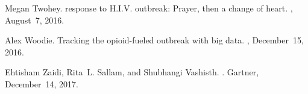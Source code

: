 \documentclass[11pt]{article}
\begin{document}
\begin{small}
\begin{thebibliography}{10}
Megan Twohey.
 response to {H.I.V}. outbreak: Prayer, then a change
  of heart.
, August~7, 2016.

Alex Woodie.
\newblock Tracking the opioid-fueled outbreak with big data.
, December~15, 2016.

Ehtisham Zaidi, Rita~L. Sallam, and Shubhangi Vashisth.
.
\newblock Gartner, December~14, 2017.
\end{thebibliography}
\end{small}
\end{document}
